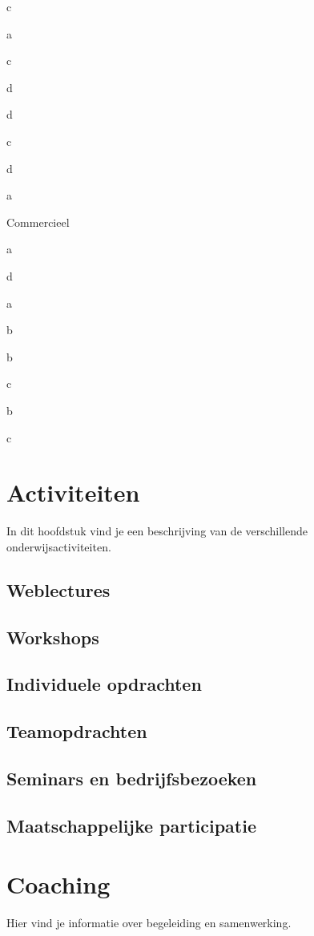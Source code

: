 \documentclass[]{book}
\begin{document}
c

a

c

d

d

c

d

a

Commercieel

a

d

a

b

b

c

b

c

\chapter{Activiteiten}\label{activiteiten}

In dit hoofdstuk vind je een beschrijving van de verschillende
onderwijsactiviteiten.

\section{Weblectures}\label{weblectures}

\section{Workshops}\label{workshops}

\section{Individuele opdrachten}\label{individuele-opdrachten}

\section{Teamopdrachten}\label{teamopdrachten}

\section{Seminars en
bedrijfsbezoeken}\label{seminars-en-bedrijfsbezoeken}

\section{Maatschappelijke
participatie}\label{maatschappelijke-participatie}

\chapter{Coaching}\label{coaching}

Hier vind je informatie over begeleiding en samenwerking.


\end{document}
